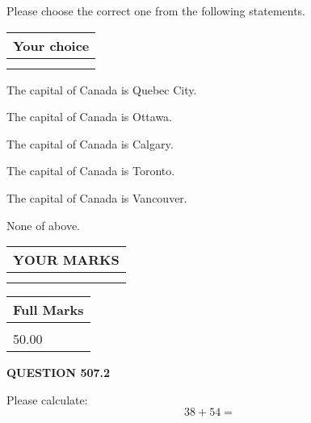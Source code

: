 \documentclass[12pt]{article}
\begin{document}
  
Please choose the correct one from the following statements.
  
  
\noindent\hspace{3.0in} \begin{tabular}{|l|}
\hline
Your choice \\
\hline
 \\ 
 \\ 
\hline
\end{tabular}
  
  
 
 
The capital of Canada is Quebec City.
 
 
The capital of Canada is Ottawa.
 
 
The capital of Canada is Calgary.
 
 
The capital of Canada is Toronto.
 
 
The capital of Canada is Vancouver.
 
 
 None of above.
 
 
  
\vspace{0.2in}
  
\noindent\begin{tabular}{|l|}
\hline
 YOUR MARKS  \\
\hline
 \\ 
 \\ 
\hline
\end{tabular}
\hspace{0.05in} \begin{tabular}{|l|}
\hline
 Full Marks  \\
\hline
 \\ 
50.00 \\
\hline
\end{tabular}
{\textbf{\Large{QUESTION
507.2 
}}}
  
  
 
Please calculate:
\begin{equation}
38 +  %
54 = \nonumber
\end{equation}
 

 

 
   
   
 \vspace{0.2in}
 
   
   
   
   
\end{document}
